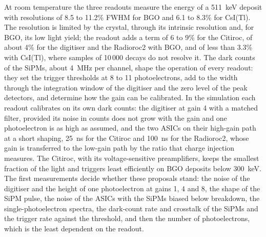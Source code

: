 \documentclass[11pt]{article}
\newcommand{\csitl}{CsI(Tl)\xspace}
\begin{document}
At room temperature the three readouts measure the energy of a 511~keV
deposit with resolutions of 8.5 to 11.2\% FWHM for BGO and 6.1 to 8.3\%
for \csitl. The resolution is limited by the crystal, through its
intrinsic resolution and, for BGO, its low light yield; the readout adds a
term of 6 to 9\% for the Citiroc, of about 4\% for the digitiser and the
Radioroc2 with BGO, and of less than 3.3\% with \csitl, where samples of
10\,000 decays do not resolve it. The dark counts of the SiPMs, about 4~MHz per channel, shape the
operation of every readout: they set the trigger thresholds at 8 to 11
photoelectrons, add to the width through the integration window of the
digitiser and the zero level of the peak detectors, and determine how the
gain can be calibrated. In the simulation each readout calibrates on its
own dark counts: the digitiser at gain 4 with a matched filter, provided
its noise in counts does not grow with the gain and one photoelectron is
as high as assumed, and the two ASICs on their high-gain path at a short
shaping, 25~ns for the Citiroc and 100~ns for the Radioroc2, whose gain is
transferred to the low-gain path by the ratio that charge injection
measures. The Citiroc, with its voltage-sensitive preamplifiers, keeps the
smallest fraction of the light and triggers least efficiently on BGO
deposits below 300~keV. The first measurements decide whether these
proposals stand: the noise of the digitiser and the height of one
photoelectron at gains 1, 4 and 8, the shape of the SiPM pulse, the noise
of the ASICs with the SiPMs biased below breakdown, the single-photoelectron
spectra, the dark-count rate and crosstalk of the SiPMs and the trigger
rate against the threshold, and then the number of photoelectrons, which
is the least dependent on the readout.
\end{document}
